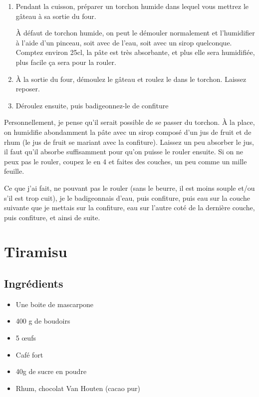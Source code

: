 \begin{enumerate}
\item Pendant la cuisson, préparer un torchon humide dans lequel vous mettrez le gâteau à sa sortie du four.
\begin{remarque}
À défaut de torchon humide, on peut le démouler normalement et l'humidifier à l'aide d'un pinceau, soit avec de l'eau, soit avec un sirop quelconque. Comptez environ 25cl, la pâte est très absorbante, et plus elle sera humidifiée, plus facile ça sera pour la rouler.
\end{remarque}
\item À la sortie du four, démoulez le gâteau et roulez le dans le torchon. Laissez reposer.
\item Déroulez ensuite, puis badigeonnez-le de confiture
\end{enumerate}

Personnellement, je pense qu'il serait possible de se passer du torchon. À la place, on humidifie abondamment la pâte avec un sirop composé d'un jus de fruit et de rhum (le jus de fruit se mariant avec la confiture). Laissez un peu absorber le jus, il faut qu'il absorbe suffisamment pour qu'on puisse le rouler ensuite. Si on ne peux pas le rouler, coupez le en 4 et faites des couches, un peu comme un mille feuille.

Ce que j'ai fait, ne pouvant pas le rouler (sans le beurre, il est moins souple et/ou s'il est trop cuit), je le badigeonnais d'eau, puis confiture, puis eau sur la couche suivante que je mettais sur la confiture, eau sur l'autre coté de la dernière couche, puis confiture, et ainsi de suite.

\newpage
\section{Tiramisu}
\subsection*{Ingrédients}
\begin{itemize}
\item Une boite de mascarpone
\item 400 g de boudoirs
\item 5 œufs
\item Café fort
\item 40g de sucre en poudre
\item Rhum, chocolat Van Houten (cacao pur)
\end{itemize}

